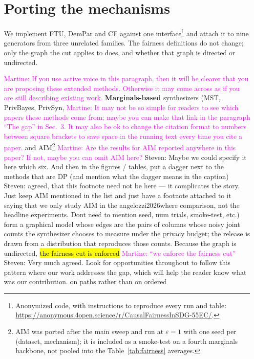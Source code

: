 \documentclass{article}
\newcommand{\martine}[1]{\textcolor{magenta}{Martine: #1}}
\newcommand{\s}[1]{\textcolor{Dandelion}{Steven: #1}}
\begin{document}
\section{Porting the mechanisms}
\label{sec:method}

We implement FTU, DemPar and CF against one
interface\footnote{Anonymized code, with instructions to reproduce every run
and table: \url{https://anonymous.4open.science/r/CausalFairnessInSDG-55EC/}.}
and attach it to nine generators from three unrelated families. The fairness definitions do not change; only
the graph the cut applies to does, and whether that graph is directed or
undirected.

\martine{If you use active voice in this paragraph, then it will be clearer that you are proposing these extended methods. Otherwise it may come across as if you are still describing existing work.}
\textbf{Marginals-based} synthesizers (MST, PrivBayes, PrivSyn, \martine{It may not be so simple for readers to see which papers these methods come from; maybe you can make that link in the paragraph ``The gap'' in Sec.~3. It may also be ok to change the citation format to numbers between square brackets to save space in the running text every time you cite a paper.} and
AIM\footnote{AIM \citep{mckenna2022aim} was ported after the main sweep and
run at $\varepsilon{=}1$ with one seed per (dataset, mechanism); it is
included as a smoke-test on a fourth marginals backbone, not pooled into the
Table~\ref{tab:fairness} averages.} \martine{Are the results for AIM reported anywhere in this paper? If not, maybe you can omit AIM here?} \s{Maybe we could specify it here which six. And then in the figures / tables, put a dagger next to the methods that are DP (and mention what the  dagger means in the caption)} \s{agreed, that this footnote need not be here --- it complicates the story. Just keep AIM mentioned in the list and just have a footnote attached to it saying that we only study AIM in the angelozzi2026where comparison, not the headline experiments. Dont need to mention seed, num trials, smoke-test, etc.}) form a
graphical model whose edges are the pairs of columns whose noisy joint counts
the synthesizer chooses to measure under the privacy budget; the release is
drawn from a distribution that reproduces those counts. Because the graph is
undirected, \hl{the fairness cut is enforced} \martine{``we enforce the fairness cut''} \s{Very much agreed. Look for opportunities throughout to follow this pattern where our work addresses the gap, which will help the reader know what was our contribution.} on paths rather than on ordered
\end{document}
